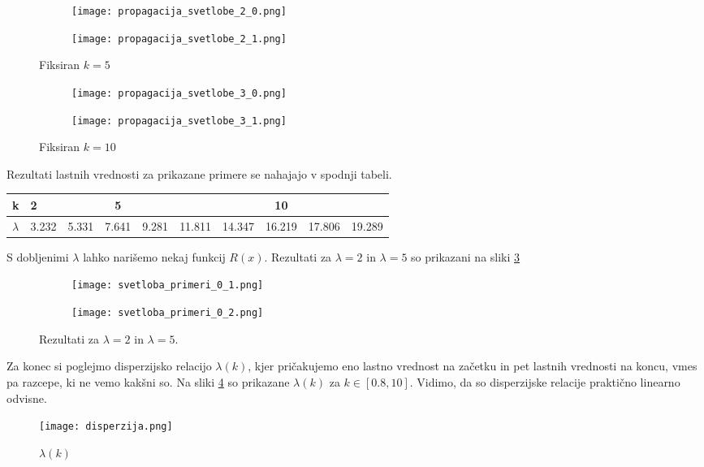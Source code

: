 \documentclass[12pt,a4paper]{article}
\begin{document}
\begin{figure}[H]
    \centering
    \begin{subfigure}[b]{0.49\textwidth}
        \texttt{[image: propagacija\_svetlobe\_2\_0.png]}
    \end{subfigure}
    \begin{subfigure}[b]{0.49\textwidth}
        \texttt{[image: propagacija\_svetlobe\_2\_1.png]}
    \end{subfigure}
    \caption{Fiksiran $k=5$} \label{fig:slika9}
\end{figure}

\begin{figure}[H]
    \centering
    \begin{subfigure}[b]{0.49\textwidth}
        \texttt{[image: propagacija\_svetlobe\_3\_0.png]}
    \end{subfigure}
    \begin{subfigure}[b]{0.49\textwidth}
        \texttt{[image: propagacija\_svetlobe\_3\_1.png]}
    \end{subfigure}
    \caption{Fiksiran $k=10$} \label{fig:slika10}
\end{figure}

\noindent Rezultati lastnih vrednosti za prikazane primere se nahajajo v spodnji tabeli. 
\begin{table}[H]
\begin{tabular}{|l|l|l|l|l|l|l|l|l|l|}
\hline
k         & 2     & \multicolumn{3}{c|}{5} & \multicolumn{5}{c|}{10}                    \\ \hline
$\lambda$ & 3.232 & 5.331  & 7.641 & 9.281 & 11.811 & 14.347 & 16.219 & 17.806 & 19.289 \\ \hline
\end{tabular}
\end{table}

S dobljenimi $\lambda$ lahko narišemo nekaj funkcij $R(x)$. Rezultati za $\lambda=2$ in $\lambda=5$ so prikazani na sliki \ref{fig:slika11}
\begin{figure}[H]
    \centering
    \begin{subfigure}[b]{0.49\textwidth}
        \texttt{[image: svetloba\_primeri\_0\_1.png]}
    \end{subfigure}
    \begin{subfigure}[b]{0.49\textwidth}
        \texttt{[image: svetloba\_primeri\_0\_2.png]}
    \end{subfigure}
    \caption{Rezultati za $\lambda=2$ in $\lambda=5$. } \label{fig:slika11}
\end{figure}

Za konec si poglejmo disperzijsko relacijo $\lambda (k)$, kjer pričakujemo eno lastno vrednost na začetku in pet lastnih vrednosti na koncu, vmes pa razcepe, ki ne vemo kakšni so. Na sliki \ref{fig:slika12} so prikazane $\lambda (k)$ za $k \in [0.8,10]$. Vidimo, da so disperzijske relacije praktično linearno odvisne.

\begin{figure}[H]
    \centering
        \texttt{[image: disperzija.png]}
    \caption{$\lambda (k)$} \label{fig:slika12}
\end{figure}
\end{document}
